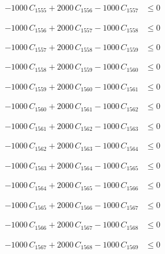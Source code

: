 \documentclass[a4paper,11pt]{article}
\begin{document}
\begin{align}
-1000\,C_{1555} + 2000\,C_{1556} - 1000\,C_{1557} &\leq 0 \nonumber
\end{align}

\begin{align}
-1000\,C_{1556} + 2000\,C_{1557} - 1000\,C_{1558} &\leq 0 \nonumber
\end{align}

\begin{align}
-1000\,C_{1557} + 2000\,C_{1558} - 1000\,C_{1559} &\leq 0 \nonumber
\end{align}

\begin{align}
-1000\,C_{1558} + 2000\,C_{1559} - 1000\,C_{1560} &\leq 0 \nonumber
\end{align}

\begin{align}
-1000\,C_{1559} + 2000\,C_{1560} - 1000\,C_{1561} &\leq 0 \nonumber
\end{align}

\begin{align}
-1000\,C_{1560} + 2000\,C_{1561} - 1000\,C_{1562} &\leq 0 \nonumber
\end{align}

\begin{align}
-1000\,C_{1561} + 2000\,C_{1562} - 1000\,C_{1563} &\leq 0 \nonumber
\end{align}

\begin{align}
-1000\,C_{1562} + 2000\,C_{1563} - 1000\,C_{1564} &\leq 0 \nonumber
\end{align}

\begin{align}
-1000\,C_{1563} + 2000\,C_{1564} - 1000\,C_{1565} &\leq 0 \nonumber
\end{align}

\begin{align}
-1000\,C_{1564} + 2000\,C_{1565} - 1000\,C_{1566} &\leq 0 \nonumber
\end{align}

\begin{align}
-1000\,C_{1565} + 2000\,C_{1566} - 1000\,C_{1567} &\leq 0 \nonumber
\end{align}

\begin{align}
-1000\,C_{1566} + 2000\,C_{1567} - 1000\,C_{1568} &\leq 0 \nonumber
\end{align}

\begin{align}
-1000\,C_{1567} + 2000\,C_{1568} - 1000\,C_{1569} &\leq 0 \nonumber
\end{align}
\end{document}
